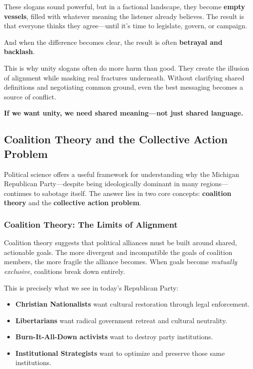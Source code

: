 These slogans sound powerful, but in a factional landscape, they become \textbf{empty vessels}, filled with whatever meaning the listener already believes. The result is that everyone thinks they agree—until it’s time to legislate, govern, or campaign.

And when the difference becomes clear, the result is often \textbf{betrayal and backlash}.

This is why unity slogans often do more harm than good. They create the illusion of alignment while masking real fractures underneath. Without clarifying shared definitions and negotiating common ground, even the best messaging becomes a source of conflict.

\textbf{If we want unity, we need shared meaning—not just shared language.}

\subsection{Coalition Theory and the Collective Action Problem}

Political science offers a useful framework for understanding why the Michigan Republican Party—despite being ideologically dominant in many regions—continues to sabotage itself. The answer lies in two core concepts: \textbf{coalition theory} and the \textbf{collective action problem}.

\subsubsection{Coalition Theory: The Limits of Alignment}
Coalition theory suggests that political alliances must be built around shared, actionable goals. The more divergent and incompatible the goals of coalition members, the more fragile the alliance becomes. When goals become \textit{mutually exclusive}, coalitions break down entirely.

This is precisely what we see in today’s Republican Party:
\begin{itemize}
\item \textbf{Christian Nationalists} want cultural restoration through legal enforcement.
\item \textbf{Libertarians} want radical government retreat and cultural neutrality.
\item \textbf{Burn-It-All-Down activists} want to destroy party institutions.
\item \textbf{Institutional Strategists} want to optimize and preserve those same institutions.
\end{itemize}


